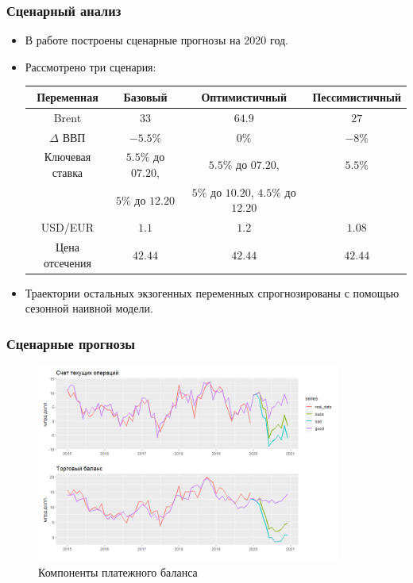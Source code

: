 \documentclass[9pt]{beamer}
\begin{document}
\begin{frame}
\frametitle{Сценарный анализ}
\begin{itemize}
		\item В работе построены сценарные прогнозы на 2020 год. 
		
		\item Рассмотрено три сценария:		
\begin{center}
	\footnotesize
	\begin{tabular}{c| c | c | c}
		Переменная & Базовый & Оптимистичный & Пессимистичный \\
		\toprule
		Brent & $33$ & $ 64.9$ & $27$ \\
		$\Delta$ ВВП &  $-5.5 \%$  & $0\%$ &  $-8\%$  \\
		Ключевая ставка &  $5.5 \%$ до $07.20$,  & $5.5 \%$ до $07.20$, &  $5.5 \%$\\
		&$5 \%$ до $12.20$ & $5 \%$ до $10.20$, $4.5 \%$ до $12.20$ & \\
		USD/EUR & $1.1$ & $1.2$ & $1.08$ \\
		Цена отсечения & $42.44$ & $42.44$ & $42.44$\\
		\bottomrule
	\end{tabular}
	\label{tab:7}
	\normalsize
\end{center}
		
\item Траектории остальных экзогенных переменных спрогнозированы с помощью сезонной наивной модели.
\end{itemize}
\end{frame}

\begin{frame}
	\frametitle{Сценарные прогнозы}
\begin{figure}[htp]
	\centering
	\includegraphics[width=10cm]{curtrade.png}
	\caption{Компоненты платежного баланса}\label{fi:7}
\end{figure}
\end{frame}
\end{document}
